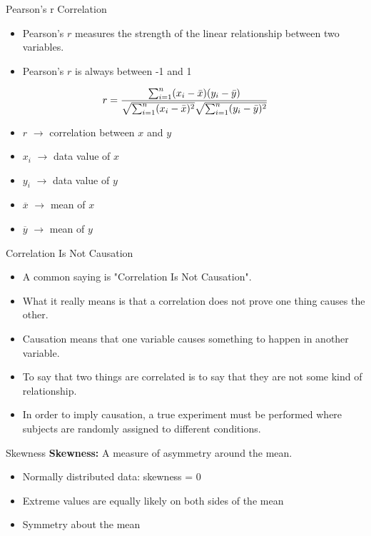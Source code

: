 \documentclass[10pt,dvipsnames, aspectratio=169]{beamer}
\begin{document}
\begin{frame}[t]{Pearson's r Correlation}
	\begin{itemize}
		\item  Pearson's $r$ measures the strength of the linear relationship 
		between two variables.
		\item Pearson's $r$ is always between -1 and 1 
	\end{itemize}
	
	\begin{equation*}
	r =
	\frac{ \sum_{i=1}^{n}(x_i-\bar{x})(y_i-\bar{y}) }{%
		\sqrt{\sum_{i=1}^{n}(x_i-\bar{x})^2}\sqrt{\sum_{i=1}^{n}(y_i-\bar{y})^2}}
	\end{equation*}
	
	
	
	\begin{itemize}
		\item $r$ $\rightarrow$ correlation between $x$ and $y$
		\item $x_i$ $ \rightarrow$ data value of $x$
		\item $y_i$ $\rightarrow$ data value of $y$
		\item $\overline{x}$ $\rightarrow$  mean of $x$
		\item $\overline{y}$ $\rightarrow$ mean of $y$
	\end{itemize}
\end{frame}

\begin{frame}[t]{Correlation Is Not Causation}
	\begin{itemize}
		\item A common saying is "Correlation Is Not Causation".
		\item What it really means is that a correlation does not prove one 
		thing causes the other.
		\item Causation means that one variable causes something to happen in 
		another variable.
		\item To say that two things are correlated is to say that they are not 
		some kind of relationship.
		\item In order to imply causation, a true experiment must be performed 
		where subjects are randomly assigned to different conditions.
	\end{itemize}
\end{frame}

\begin{frame}[t]{Skewness}
	\textbf{Skewness:} 
	A measure of asymmetry around the mean.
	
	\begin{itemize}
		\item Normally distributed data: skewness = 0
		\item Extreme values are equally likely on both
		sides of the mean
		\item Symmetry about the mean
	\end{itemize}
\end{frame}
\end{document}
